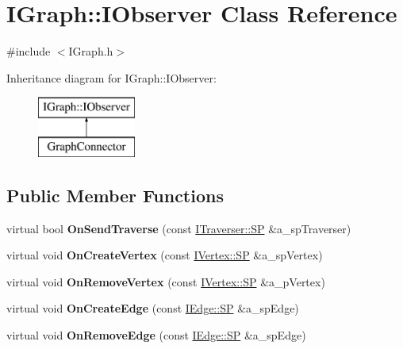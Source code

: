 \hypertarget{class_i_graph_1_1_i_observer}{}\section{I\+Graph\+:\+:I\+Observer Class Reference}
\label{class_i_graph_1_1_i_observer}


{\ttfamily \#include $<$I\+Graph.\+h$>$}

Inheritance diagram for I\+Graph\+:\+:I\+Observer\+:\begin{figure}[H]
\begin{center}
\leavevmode
\includegraphics[height=2.000000cm]{class_i_graph_1_1_i_observer}
\end{center}
\end{figure}
\subsection*{Public Member Functions}
\begin{DoxyCompactItemize}
\item 
\mbox{\label{class_i_graph_1_1_i_observer_ae2df91ca5265fa0ee7c29be808adbb4c}} 
virtual bool {\bfseries On\+Send\+Traverse} (const \hyperlink{class_i_graph_1_1_i_traverser_a5a5ccc81423d6024742d1898a310d812}{I\+Traverser\+::\+SP} \&a\+\_\+sp\+Traverser)
\item 
\mbox{\label{class_i_graph_1_1_i_observer_a4af443d56a0bde4892a79b8e0e0ded30}} 
virtual void {\bfseries On\+Create\+Vertex} (const \hyperlink{class_i_graph_1_1_i_vertex_af72b9df91f110bc7824c608c10cc819c}{I\+Vertex\+::\+SP} \&a\+\_\+sp\+Vertex)
\item 
\mbox{\label{class_i_graph_1_1_i_observer_af806ec0d45a7d4fefc0b1e41d4ec4a5c}} 
virtual void {\bfseries On\+Remove\+Vertex} (const \hyperlink{class_i_graph_1_1_i_vertex_af72b9df91f110bc7824c608c10cc819c}{I\+Vertex\+::\+SP} \&a\+\_\+p\+Vertex)
\item 
\mbox{\label{class_i_graph_1_1_i_observer_a7166b09fee1e45e8a99d476de7ddb3e7}} 
virtual void {\bfseries On\+Create\+Edge} (const \hyperlink{class_i_graph_1_1_i_edge_adfae3ec3e377543685a06b9c5d5a776a}{I\+Edge\+::\+SP} \&a\+\_\+sp\+Edge)
\item 
\mbox{\label{class_i_graph_1_1_i_observer_a6de52dcef01eaa3b6c0fc024cd324cb7}} 
virtual void {\bfseries On\+Remove\+Edge} (const \hyperlink{class_i_graph_1_1_i_edge_adfae3ec3e377543685a06b9c5d5a776a}{I\+Edge\+::\+SP} \&a\+\_\+sp\+Edge)
\end{DoxyCompactItemize}



